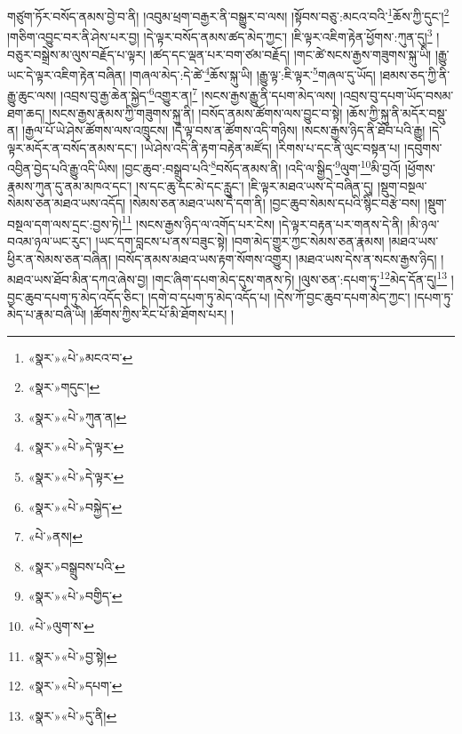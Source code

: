གཙུག་ཏོར་བསོད་ནམས་བྱེ་བ་ནི། །འབུམ་ཕྲག་བརྒྱར་ནི་བསྒྱུར་བ་ལས། །སྟོབས་བཅུ་:མངའ་བའི་\footnote{«སྣར་»«པེ་»མངའ་བ་}ཆོས་ཀྱི་དུང་།\footnote{«སྣར་»གདུང་།} །གཅིག་འབྱུང་བར་ནི་ཤེས་པར་བྱ། །དེ་ལྟར་བསོད་ནམས་ཚད་མེད་ཀྱང་། །ཇི་ལྟར་འཇིག་རྟེན་ཕྱོགས་:ཀུན་དུ།\footnote{«སྣར་»«པེ་»ཀུན་ན།} །བཅུར་བསྒྲེས་མ་ལུས་བརྗོད་པ་ལྟར། །ཚད་དང་ལྡན་པར་བག་ཙམ་བརྗོད། །གང་ཚེ་སངས་རྒྱས་གཟུགས་སྐུ་ཡི། །རྒྱུ་ཡང་དེ་ལྟར་འཇིག་རྟེན་བཞིན། །གཞལ་མེད་:དེ་ཚེ་\footnote{«སྣར་»«པེ་»དེ་ལྟར་}ཆོས་སྐུ་ཡི། །རྒྱུ་ལྟ་:ཇི་ལྟར་\footnote{«སྣར་»«པེ་»དེ་ལྟར་}གཞལ་དུ་ཡོད། །ཐམས་ཅད་ཀྱི་ནི་རྒྱུ་ཆུང་ལས། །འབྲས་བུ་རྒྱ་ཆེན་སྐྱེད་\footnote{«སྣར་»«པེ་»བསྐྱེད་}འགྱུར་ན།\footnote{«པེ་»ནས།} །སངས་རྒྱས་རྒྱུ་ནི་དཔག་མེད་ལས། །འབྲས་བུ་དཔག་ཡོད་བསམ་ཐག་ཆད། །སངས་རྒྱས་རྣམས་ཀྱི་གཟུགས་སྐུ་ནི། །བསོད་ནམས་ཚོགས་ལས་བྱུང་བ་སྟེ། །ཆོས་ཀྱི་སྐུ་ནི་མདོར་བསྡུ་ན། །རྒྱལ་པོ་ཡེ་ཤེས་ཚོགས་ལས་འཁྲུངས། །དེ་ལྟ་བས་ན་ཚོགས་འདི་གཉིས། །སངས་རྒྱས་ཉིད་ནི་ཐོབ་པའི་རྒྱུ། །དེ་ལྟར་མདོར་ན་བསོད་ནམས་དང་། །ཡེ་ཤེས་འདི་ནི་རྟག་བརྟེན་མཛོད། །རིགས་པ་དང་ནི་ལུང་བསྟན་པ། །དབུགས་འབྱིན་བྱེད་པའི་རྒྱུ་འདི་ཡིས། །བྱང་ཆུབ་:བསྒྲུབ་པའི་\footnote{«སྣར་»བསྒྲུབས་པའི་}བསོད་ནམས་ནི། །འདི་ལ་སྒྱིད་\footnote{«སྣར་»«པེ་»བགྱིད་}ལུག་\footnote{«པེ་»ལུག་ས་}མི་བྱའོ། །ཕྱོགས་རྣམས་ཀུན་དུ་ནམ་མཁའ་དང་། །ས་དང་ཆུ་དང་མེ་དང་རླུང་། །ཇི་ལྟར་མཐའ་ཡས་དེ་བཞིན་དུ། །སྡུག་བསྔལ་སེམས་ཅན་མཐའ་ཡས་འདོད། །སེམས་ཅན་མཐའ་ཡས་དེ་དག་ནི། །བྱང་ཆུབ་སེམས་དཔའི་སྙིང་བརྩེ་བས། །སྡུག་བསྔལ་དག་ལས་དྲང་:བྱས་ཏེ།\footnote{«སྣར་»«པེ་»བྱ་སྟེ།} །སངས་རྒྱས་ཉིད་ལ་འགོད་པར་ངེས། །དེ་ལྟར་བརྟན་པར་གནས་དེ་ནི། །མི་ཉལ་བའམ་ཉལ་ཡང་རུང་། །ཡང་དག་བླངས་པ་ནས་བཟུང་སྟེ། །བག་མེད་གྱུར་ཀྱང་སེམས་ཅན་རྣམས། །མཐའ་ཡས་ཕྱིར་ན་སེམས་ཅན་བཞིན། །བསོད་ནམས་མཐའ་ཡས་རྟག་སོགས་འགྱུར། །མཐའ་ཡས་དེས་ན་སངས་རྒྱས་ཉིད། །མཐའ་ཡས་ཐོབ་མིན་དཀའ་ཞེས་བྱ། །གང་ཞིག་དཔག་མེད་དུས་གནས་ཏེ། །ལུས་ཅན་:དཔག་ཏུ་\footnote{«སྣར་»«པེ་»དཔག་}མེད་དོན་དུ།\footnote{«སྣར་»«པེ་»དུ་ནི།} །བྱང་ཆུབ་དཔག་ཏུ་མེད་འདོད་ཅིང་། །དགེ་བ་དཔག་ཏུ་མེད་འདོད་པ། །དེས་ཀོ་བྱང་ཆུབ་དཔག་མེད་ཀྱང་། །དཔག་ཏུ་མེད་པ་རྣམ་བཞི་ཡི། །ཚོགས་ཀྱིས་རིང་པོ་མི་ཐོགས་པར། །
